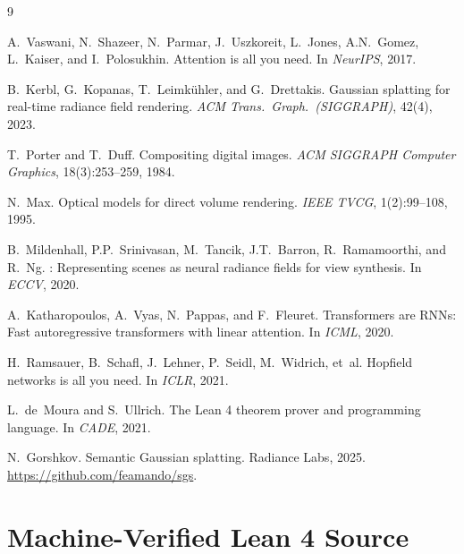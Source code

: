 \documentclass[11pt]{article}
\begin{document}

\begin{thebibliography}{9}

A.~Vaswani, N.~Shazeer, N.~Parmar, J.~Uszkoreit, L.~Jones, A.N.~Gomez, L.~Kaiser, and I.~Polosukhin.
\newblock Attention is all you need.
\newblock In \emph{NeurIPS}, 2017.

B.~Kerbl, G.~Kopanas, T.~Leimk{\"u}hler, and G.~Drettakis.
 {G}aussian splatting for real-time radiance field rendering.
\newblock \emph{ACM Trans.\ Graph.\ (SIGGRAPH)}, 42(4), 2023.

T.~Porter and T.~Duff.
\newblock Compositing digital images.
\newblock \emph{ACM SIGGRAPH Computer Graphics}, 18(3):253--259, 1984.

N.~Max.
\newblock Optical models for direct volume rendering.
\newblock \emph{IEEE TVCG}, 1(2):99--108, 1995.

B.~Mildenhall, P.P.~Srinivasan, M.~Tancik, J.T.~Barron, R.~Ramamoorthi, and R.~Ng.
: Representing scenes as neural radiance fields for view synthesis.
\newblock In \emph{ECCV}, 2020.

A.~Katharopoulos, A.~Vyas, N.~Pappas, and F.~Fleuret.
\newblock Transformers are {RNN}s: Fast autoregressive transformers with linear attention.
\newblock In \emph{ICML}, 2020.

H.~Ramsauer, B.~Schafl, J.~Lehner, P.~Seidl, M.~Widrich, et~al.
\newblock Hopfield networks is all you need.
\newblock In \emph{ICLR}, 2021.

L.~de~Moura and S.~Ullrich.
\newblock The {L}ean 4 theorem prover and programming language.
\newblock In \emph{CADE}, 2021.

N.~Gorshkov.
\newblock Semantic {G}aussian splatting.
\newblock Radiance Labs, 2025.
\newblock \url{https://github.com/feamando/sgs}.

\end{thebibliography}

\appendix

\section{Machine-Verified Lean 4 Source}
\label{app:lean}
\end{document}
